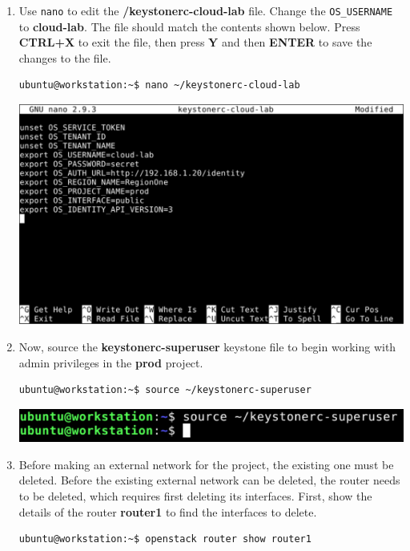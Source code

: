 \documentclass[letterpaper, 12pt]{article}
\begin{document}
\begin{enumerate}
    \item Use \texttt{nano} to edit the \textbf{\texttildemid/keystonerc-cloud-lab} file. Change the
    \texttt{OS\_USERNAME} to \textbf{cloud-lab}. The file should match the contents shown below. Press \textbf{CTRL+X}
    to exit the file, then press \textbf{Y} and then \textbf{ENTER} to save the changes to the file.
\begin{lstlisting}
ubuntu@workstation:~$ nano ~/keystonerc-cloud-lab
\end{lstlisting}

    \begin{center}
        \includegraphics[width=\linewidth]{images/part1/step12.png}
    \end{center}

    \item Now, source the \textbf{keystonerc-superuser} keystone file to begin working with admin privileges in the
    \textbf{prod} project.
\begin{lstlisting}
ubuntu@workstation:~$ source ~/keystonerc-superuser
\end{lstlisting}

    \begin{center}
        \includegraphics[width=\linewidth]{images/part1/step13.png}
    \end{center}

    \item Before making an external network for the project, the existing one must be deleted. Before the existing
    external network can be deleted, the router needs to be deleted, which requires first deleting its interfaces.
    First, show the details of the router \textbf{router1} to find the interfaces to delete.
\begin{lstlisting}
ubuntu@workstation:~$ openstack router show router1
\end{lstlisting}


\end{enumerate}
\end{document}
